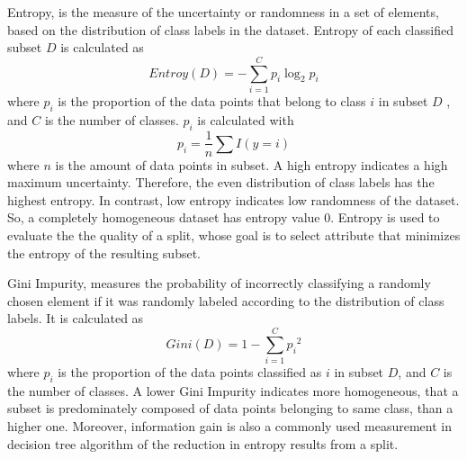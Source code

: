 \documentclass[12pt,a4paper,english
]{tunithesis}
\begin{document}
Entropy, is the measure of the uncertainty or randomness in a set of elements, based on the distribution of class labels in the dataset. Entropy of each classified subset ${D}$ is calculated as
\begin{equation*}
    Entroy(D)=-\sum_{i = 1}^C {p_i} \log _2 {p_i}
\end{equation*}
where ${p_i}$ is the proportion of the data points that belong to class ${i}$ in subset ${D}$ , and ${C}$ is the number of classes. ${p_i}$ is calculated with
\begin{equation*}
    p_i = \frac{1}{n} \sum I(y=i)
\end{equation*}
where ${n}$ is the amount of data points in subset.
A high entropy indicates a high maximum uncertainty. Therefore, the even distribution of class labels has the highest entropy. In contrast, low entropy indicates low randomness of the dataset. So, a completely homogeneous dataset has entropy value 0. Entropy is used to evaluate the the quality of a split, whose goal is to select attribute that minimizes the entropy of the resulting subset.

Gini Impurity, measures the probability of incorrectly classifying a randomly chosen element if it was randomly labeled according to the distribution of class labels. It is calculated as 
\begin{equation*}
    Gini(D) = 1-\sum_{i=1}^C {p_i}^2
\end{equation*}
where ${p_i}$ is the proportion of the data points classified as ${i}$ in subset ${D}$, and ${C}$ is the number of classes. A lower Gini Impurity indicates more homogeneous, that a subset is predominately composed of data points belonging to same class, than a higher one. Moreover, information gain is also a commonly used measurement in decision tree algorithm of the reduction in entropy results from a split.
\end{document}
